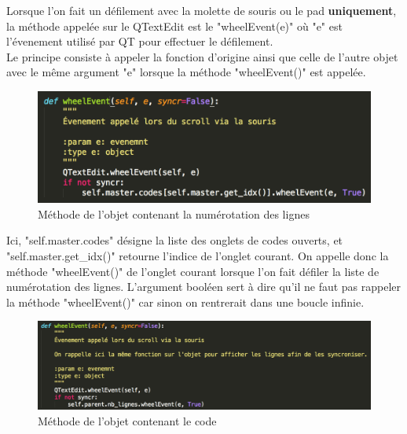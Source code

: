 \documentclass[a4paper,12pt]{article}
\begin{document}
		Lorsque l'on fait un défilement avec la molette de souris ou le pad \textbf{uniquement}, la méthode appelée sur le QTextEdit est le "wheelEvent(e)" où "e" est l'évenement utilisé par QT pour effectuer le défilement.\\
		
		Le principe consiste à appeler la fonction d'origine ainsi que celle de l'autre objet avec le même argument "e" lorsque la méthode "wheelEvent()" est appelée.
		
		\newpage
		
		\begin{figure}[h!]
			\begin{center}
				\includegraphics[scale=0.9]{images/imgs_lines/wheel_lines}
				\caption{Méthode de l'objet contenant la numérotation des lignes}
			\end{center}
		\end{figure}
		
		
		Ici, "self.master.codes" désigne la liste des onglets de codes ouverts, et "self.master.get\_idx()" retourne l'indice de l'onglet courant. On appelle donc la méthode "wheelEvent()" de l'onglet courant lorsque l'on fait défiler la liste de numérotation des lignes. L'argument booléen sert à dire qu'il ne faut pas rappeler la méthode "wheelEvent()" car sinon on rentrerait dans une boucle infinie.\\
		
		\begin{figure}[h!]
			\begin{center}
				\includegraphics[scale=0.7]{images/imgs_lines/wheel_code}
				\caption{Méthode de l'objet contenant le code}
			\end{center}
		\end{figure}
		
\end{document}
